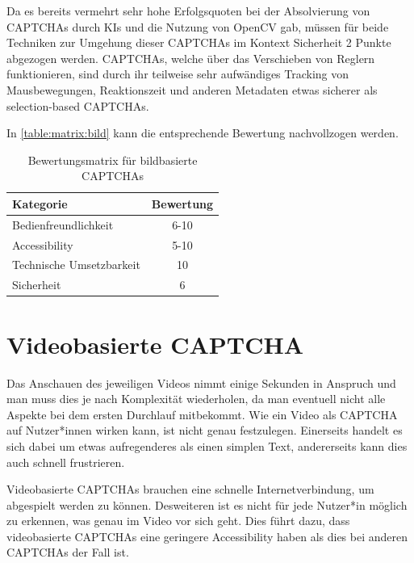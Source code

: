 \pagebreak

Da es bereits vermehrt sehr hohe Erfolgsquoten bei der Absolvierung von CAPTCHAs durch KIs und die Nutzung von OpenCV gab,
müssen für beide Techniken zur Umgehung dieser CAPTCHAs im Kontext Sicherheit 2 Punkte abgezogen werden.
CAPTCHAs, welche über das Verschieben von Reglern funktionieren, sind durch ihr teilweise sehr aufwändiges Tracking von Mausbewegungen,
Reaktionszeit und anderen Metadaten etwas sicherer als selection-based CAPTCHAs. \cite[p.77f]{surveyofresearch}

In \autoref{table:matrix:bild} kann die entsprechende Bewertung nachvollzogen werden.

\begin{table}[h!]
    \caption{Bewertungsmatrix für bildbasierte CAPTCHAs}
    \begin{center}
        \begin{tabular}{l|c}
            Kategorie                       & Bewertung \\\hline
            Bedienfreundlichkeit            & 6-10         \\
            Accessibility                   & 5-10        \\
            Technische Umsetzbarkeit        & 10         \\
            Sicherheit                      & 6         
        \end{tabular}
    \end{center}
    \label{table:matrix:bild}
\end{table}

\section{Videobasierte CAPTCHA}
Das Anschauen des jeweiligen Videos nimmt einige Sekunden in Anspruch und man muss dies je nach Komplexität wiederholen, 
da man eventuell nicht alle Aspekte bei dem ersten Durchlauf mitbekommt.
Wie ein Video als CAPTCHA auf Nutzer*innen wirken kann, ist nicht genau festzulegen.
Einerseits handelt es sich dabei um etwas aufregenderes als einen simplen Text, andererseits kann dies auch schnell frustrieren.

Videobasierte CAPTCHAs brauchen eine schnelle Internetverbindung, um abgespielt werden zu können. 
Desweiteren ist es nicht für jede Nutzer*in möglich zu erkennen, was genau im Video vor sich geht.
Dies führt dazu, dass videobasierte CAPTCHAs eine geringere Accessibility haben als dies bei anderen CAPTCHAs der Fall ist. 

